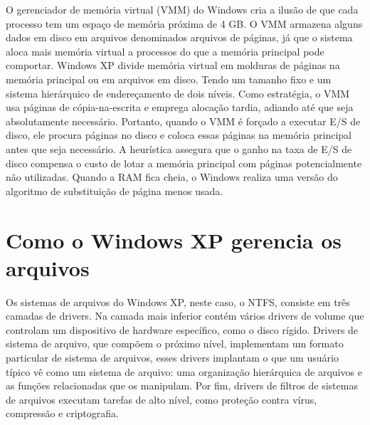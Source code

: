 \documentclass[
	12pt,				%
	oneside,   	        %
	a4paper,			%
	english,			%
	french,				%
	spanish,			%
	brazil,				%
	]{pacotes/abntex2}
\begin{document}
O gerenciador de memória virtual (VMM) do Windows cria a ilusão de que cada
processo tem um espaço de memória próxima de 4 GB. O VMM armazena alguns
dados em disco em arquivos denominados arquivos de páginas, já que o sistema
aloca mais memória virtual a processos do que a memória principal pode comportar.
Windows XP divide memória virtual em molduras de páginas na memória principal ou
em arquivos em disco. Tendo um tamanho fixo e um sistema hierárquico de
endereçamento de dois níveis. Como estratégia, o VMM usa páginas de
cópia-na-escrita e emprega alocação tardia, adiando até que seja absolutamente
necessário. Portanto, quando o VMM é forçado a executar E/S de disco, ele procura
páginas no disco e coloca essas páginas na memória principal antes que seja
necessário. A heurística assegura que o ganho na taxa de E/S de disco compensa o
custo de lotar a memória principal com páginas potencialmente não utilizadas.
Quando a RAM fica cheia, o Windows realiza uma versão do algoritmo de
substituição de página menos usada.


\section{\textbf{Como o Windows XP gerencia os arquivos}}
\label{sec:arq-arquivos-windows}

Os sistemas de arquivos do Windows XP, neste caso, o NTFS, consiste em três
camadas de drivers. Na camada mais inferior contém vários drivers de volume que
controlam um dispositivo de hardware específico, como o disco rígido. Drivers de
sistema de arquivo, que compõem o próximo nível, implementam um formato
particular de sistema de arquivos, esses drivers implantam o que um usuário típico
vê como um sistema de arquivo: uma organização hierárquica de arquivos e as
funções relacionadas que os manipulam. Por fim, drivers de filtros de sistemas de
arquivos executam tarefas de alto nível, como proteção contra vírus, compressão e
criptografia.

\newpage
\postextual
\renewcommand{\bibsection}{%
\section{\bibname}
\bibmark
\prebibhook}
\end{document}
